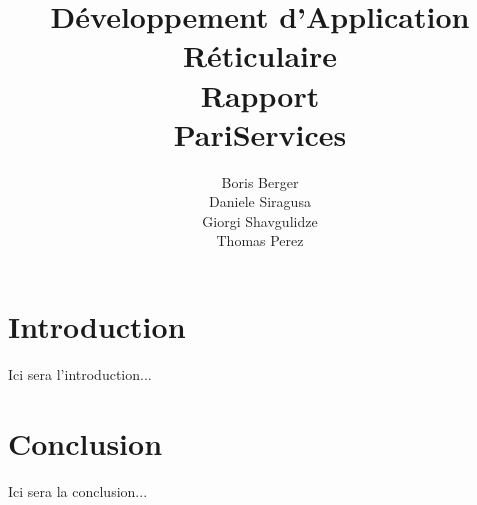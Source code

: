 \documentclass[a4paper,11pt]{article}
\author{Boris Berger\\Daniele Siragusa\\Giorgi Shavgulidze\\Thomas Perez}
\title{Développement d'Application Réticulaire\\Rapport\\PariServices}
\begin{document}
\maketitle
\newpage

\tableofcontents
\newpage

\section{Introduction}
Ici sera l'introduction...









\section{Conclusion}
Ici sera la conclusion...
\end{document}
